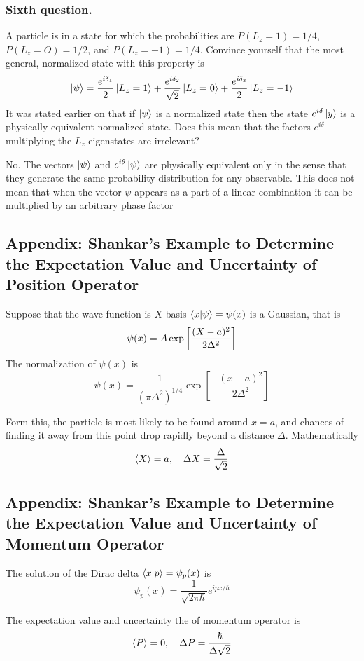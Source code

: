 \documentclass[../../../main.tex]{subfiles}
\begin{document}
\subsubsection{Sixth question.}
A particle is in a state for which the probabilities are $P(L_z=1)=1/4$, $P(L_z=O)=1/2$, and $P(L_z =-1)= 1 /4$.
Convince yourself that the most general, normalized state with this property is
\begin{equation*}
    \ket{\psi}=\frac{e^{i\delta_1 }}{2 }\ket{L_z=1}+\frac{e^{i \delta_2 }}{\sqrt{2 }}\ket{L_z=0}+\frac{e^{i \delta_3 }}{2}\ket{L_z=-1}
\end{equation*}
It was stated earlier on that if $\ket{\psi}$ is a normalized state then the state $e^{i\delta}\ket{y}$ is a physically equivalent normalized state.
Does this mean that the factors $e^{i\delta}$ multiplying the $L_z$ eigenstates are irrelevant?

No.
The vectors $\ket{\psi}$ and $e^{i\theta}\ket{\psi}$ are physically equivalent only in the sense that they generate the same probability distribution for any observable.
This does not mean that when the vector $\psi$ appears as a part of a linear combination it can be multiplied by an arbitrary phase factor

\subsection{Appendix: Shankar's Example to Determine the Expectation Value and Uncertainty of Position Operator}
Suppose that the wave function is $X$ basis $\braket{x|\psi}=\psi(x)$ is a Gaussian, that is
\begin{equation*}
    \psi(x)=A \exp \left[ \-\frac{(X-a)^2 }{2\Delta^2} \right] 
\end{equation*}
The normalization of $\psi(x )$ is 
\begin{equation*}
    \psi(x)=\frac{1 }{(\pi\Delta^2)^{1/4}}\exp \left[ -\frac{(x-a )^2}{2\Delta^2} \right] 
\end{equation*}

Form this, the particle is most likely to be found around $x =a$, and chances of finding it away from this point drop rapidly beyond a distance $\Delta$. 
Mathematically
\begin{equation*}
    \braket{X}=a,\quad\Delta X=\frac{\Delta}{\sqrt{2}}
\end{equation*}

\subsection{Appendix: Shankar's Example to Determine the Expectation Value and Uncertainty of Momentum Operator}
The solution of the Dirac delta $\braket{x|p}=\psi_p(x)$ is 
\begin{equation*}
    \psi_p(x)=\frac{1 }{\sqrt{2\pi \hbar}}e^{ipx/\hbar} 
\end{equation*}

The expectation value and uncertainty the of momentum operator is
\begin{equation*}
    \braket{P}=0,\quad\Delta P=\frac{\hbar}{\Delta\sqrt{2}}
\end{equation*}
\end{document}
